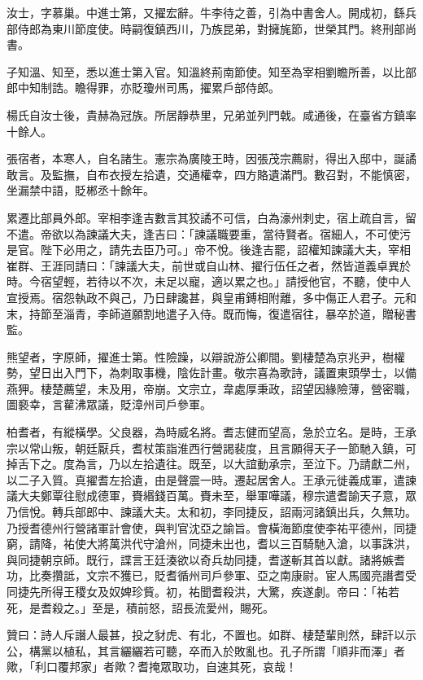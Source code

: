 \begin{pinyinscope}
 汝士，字慕巢。中進士第，又擢宏辭。牛李待之善，引為中書舍人。開成初，繇兵部侍郎為東川節度使。時嗣復鎮西川，乃族昆弟，對擁旄節，世榮其門。終刑部尚書。



 子知溫、知至，悉以進士第入官。知溫終荊南節使。知至為宰相劉瞻所善，以比部郎中知制誥。瞻得罪，亦貶瓊州司馬，擢累戶部侍郎。



 楊氏自汝士後，貴赫為冠族。所居靜恭里，兄弟並列門戟。咸通後，在臺省方鎮率十餘人。



 張宿者，本寒人，自名諸生。憲宗為廣陵王時，因張茂宗薦尉，得出入邸中，誕譎敢言。及監撫，自布衣授左拾遺，交通權幸，四方賂遺滿門。數召對，不能慎密，坐漏禁中語，貶郴丞十餘年。



 累遷比部員外郎。宰相李逢吉數言其狡譎不可信，白為濠州刺史，宿上疏自言，留不遣。帝欲以為諫議大夫，逢吉曰：「諫議職要重，當待賢者。宿細人，不可使污是官。陛下必用之，請先去臣乃可。」帝不悅。後逢吉罷，詔權知諫議大夫，宰相崔群、王涯同請曰：「諫議大夫，前世或自山林、擢行伍任之者，然皆道義卓異於時。今宿望輕，若待以不次，未足以寵，適以累之也。」請授他官，不聽，使中人宣授焉。宿怨執政不與己，乃日肆讒甚，與皇甫鎛相附離，多中傷正人君子。元和末，持節至淄青，李師道願割地遣子入侍。既而悔，復遣宿往，暴卒於道，贈秘書監。



 熊望者，字原師，擢進士第。性險躁，以辯說游公卿間。劉棲楚為京兆尹，樹權勢，望日出入門下，為刺取事機，陰佐計畫。敬宗喜為歌詩，議置東頭學士，以備燕狎。棲楚薦望，未及用，帝崩。文宗立，韋處厚秉政，詔望因緣險薄，營密職，圖褻幸，言雚沸眾議，貶漳州司戶參軍。



 柏耆者，有縱橫學。父良器，為時威名將。耆志健而望高，急於立名。是時，王承宗以常山叛，朝廷厭兵，耆杖策詣淮西行營謁裴度，且言願得天子一節馳入鎮，可掉舌下之。度為言，乃以左拾遺往。既至，以大誼動承宗，至泣下。乃請獻二州，以二子入質。真擢耆左拾遺，由是聲震一時。遷起居舍人。王承元徙義成軍，遣諫議大夫鄭覃往慰成德軍，賚緡錢百萬。賚未至，舉軍嘩議，穆宗遣耆諭天子意，眾乃信悅。轉兵部郎中、諫議大夫。太和初，李同捷反，詔兩河諸鎮出兵，久無功。乃授耆德州行營諸軍計會使，與判官沈亞之諭旨。會橫海節度使李祐平德州，同捷窮，請降，祐使大將萬洪代守滄州，同捷未出也，耆以三百騎馳入滄，以事誅洪，與同捷朝京師。既行，諜言王廷湊欲以奇兵劫同捷，耆遂斬其首以獻。諸將嫉耆功，比奏攢詆，文宗不獲已，貶耆循州司戶參軍、亞之南康尉。宦人馬國亮譖耆受同捷先所得王稷女及奴婢珍貲。初，祐聞耆殺洪，大驚，疾遂劇。帝曰：「祐若死，是耆殺之。」至是，積前怒，詔長流愛州，賜死。



 贊曰：詩人斥譖人最甚，投之豺虎、有北，不置也。如群、棲楚輩則然，肆訐以示公，構黨以植私，其言纚纚若可聽，卒而入於敗亂也。孔子所謂「順非而澤」者歟，「利口覆邦家」者歟？耆掩眾取功，自速其死，哀哉！



\end{pinyinscope}